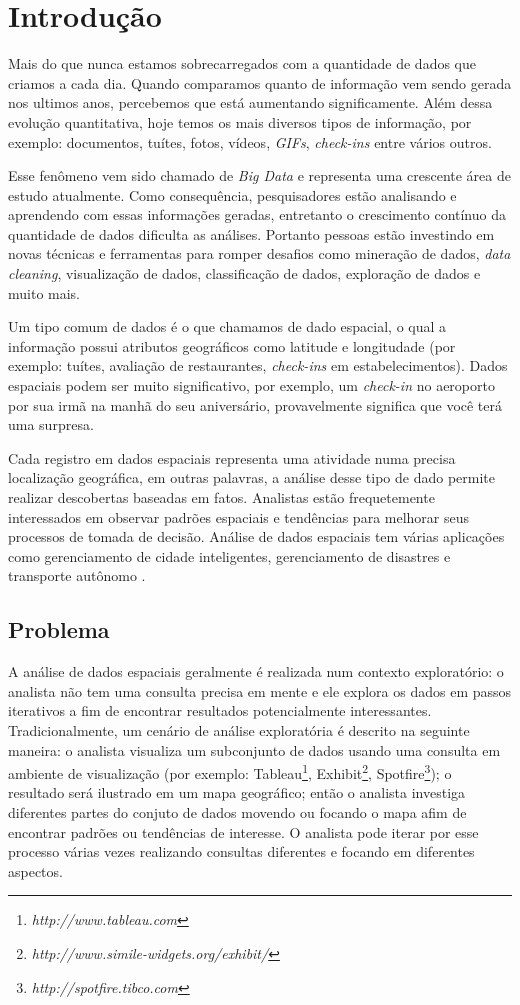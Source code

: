 \chapter{Introdução}
\label{chap:intro}

Mais do que nunca estamos sobrecarregados com a quantidade de dados que criamos a cada dia. Quando comparamos quanto de informação vem sendo gerada nos ultimos anos, percebemos que está aumentando significamente. Além dessa evolução quantitativa, hoje temos os mais diversos tipos de informação, por exemplo: documentos, tuítes, fotos, vídeos, \textit{GIFs}, \textit{check-ins} entre vários outros.

Esse fenômeno vem sido chamado de \textit{Big Data} e representa uma crescente área de estudo atualmente. Como consequência, pesquisadores estão analisando e aprendendo com essas informações geradas, entretanto o crescimento contínuo da quantidade de dados dificulta as análises. Portanto pessoas estão investindo em novas técnicas e ferramentas para romper desafios como mineração de dados, {\em data cleaning}, visualização de dados, classificação de dados, exploração de dados e muito mais.

Um tipo comum de dados é o que chamamos de dado espacial, o qual a informação possui atributos geográficos como latitude e longitudade (por exemplo: tuítes, avaliação de restaurantes, {\em check-ins} em estabelecimentos). Dados espaciais podem ser muito significativo, por exemplo, um {\em check-in} no aeroporto por sua irmã na manhã do seu aniversário, provavelmente significa que você terá uma surpresa.

Cada registro em dados espaciais representa uma atividade numa precisa localização geográfica, em outras palavras, a análise desse tipo de dado permite realizar descobertas baseadas em fatos. Analistas estão frequetemente interessados em observar padrões espaciais e tendências para melhorar seus processos de tomada de decisão. Análise de dados espaciais tem várias aplicações como gerenciamento de cidade inteligentes, gerenciamento de disastres e transporte autônomo \cite{RoddickEHPS04,Telang:2012}.

\section{Problema}

A análise de dados espaciais geralmente é realizada num contexto exploratório: o analista não tem uma consulta precisa em mente e ele explora os dados em passos iterativos a fim de encontrar resultados potencialmente interessantes. Tradicionalmente, um cenário de análise exploratória é descrito na seguinte maneira: o analista visualiza um subconjunto de dados usando uma consulta em ambiente de visualização (por exemplo: Tableau\footnote{\it http://www.tableau.com},
Exhibit\footnote{\it http://www.simile-widgets.org/exhibit/},
Spotfire\footnote{\it http://spotfire.tibco.com}); o resultado será ilustrado em um mapa geográfico; então o analista investiga diferentes partes do conjuto de dados movendo ou focando o mapa afim de encontrar padrões ou tendências de interesse. O analista pode iterar por esse processo várias vezes realizando consultas diferentes e focando em diferentes aspectos.


